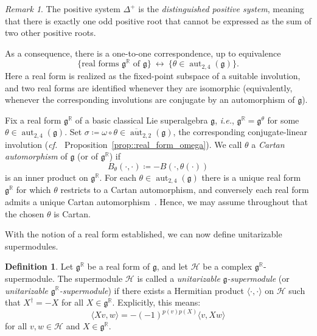 \documentclass[11pt]{amsart}
\newcommand{\bracket}{{\langle \cdot,\cdot \rangle}}
\newcommand{\HH}{{\mathbb H}}
\def\RR{{\mathbb R}}
\def\HH{{\mathcal{H}}}
\def\bra{{\langle}}
\def\aut{{\operatorname{aut}}}
\def\ket{{\rangle}}
\def\gg{{\mathfrak{g}}}
\theoremstyle{plain}
\theoremstyle{remark}
\theoremstyle{definition}
\newtheorem{definition}[theorem]{Definition}
\numberwithin{equation}{section}
\theoremstyle{remark}
\newtheorem{remark}[theorem]{Remark}
\begin{document}
\begin{remark}
 The positive system $\Delta^{+}$ is the \emph{distinguished positive system}, meaning that there is exactly one odd positive root that cannot be expressed as the sum of two other positive roots.
\end{remark}

As a consequence, there is a one-to-one correspondence, up to equivalence~\cite{Serganova_real,Pellegrini,Fioresi_real_forms,Chuah_real}
\begin{equation}
 \{\text{real forms }\gg^{\RR}\text{ of }\gg\}\ \longleftrightarrow\ \{\theta\in\aut_{2,4}(\gg)\}.
\end{equation}
Here a real form is realized as the fixed-point subspace of a suitable involution, and two real forms are identified whenever they are isomorphic (equivalently, whenever the corresponding involutions are conjugate by an automorphism of $\gg$).

Fix a real form $\gg^{\RR}$ of a basic classical Lie superalgebra $\gg$, \emph{i.e.}, $\gg^{\RR}=\gg^{\theta}$ for some
$\theta\in\aut_{2,4}(\gg)$. Set $\sigma\coloneqq \omega\circ\theta\in\overline{\aut}_{2,2}(\gg)$, the corresponding conjugate-linear
involution (\emph{cf.}~ Proposition~\ref{prop::real_form_omega}). We call $\theta$ a \emph{Cartan automorphism} of $\gg$ (or of
$\gg^{\RR}$) if
\begin{equation}\label{eq::inner_product}
 B_{\theta}(\cdot,\cdot)\coloneqq -B(\cdot,\theta(\cdot))
\end{equation}
is an inner product on $\gg^{\RR}$. For each $\theta\in\aut_{2,4}(\gg)$ there is a unique real form $\gg^{\RR}$ for which
$\theta$ restricts to a Cartan automorphism, and conversely each real form admits a unique Cartan automorphism~\cite[Theorem~1.1]{Chuah_real}.
Hence, we may assume throughout that the chosen $\theta$ is Cartan.

With the notion of a real form established, we can now define unitarizable supermodules.

\begin{definition}
 Let $\gg^{\RR}$ be a real form of $\gg$, and let $\HH$ be a complex $\gg^{\RR}$-supermodule. The supermodule $\HH$ is called a \emph{unitarizable} $\gg$\emph{-supermodule} (or \emph{unitarizable} $\gg^{\RR}$\emph{-supermodule}) if there exists a Hermitian product $\bracket$ on $\HH$ such that $X^{\dagger}=-X$ for all $X \in \gg^{\RR}$. Explicitly, this means:
 \[
 \langle Xv,w\ket=-(-1)^{p(v)p(X)}\bra v,Xw\ket
 \]
 for all $v,w \in \HH$ and $X \in \gg^{\RR}$.
\end{definition}
\end{document}
